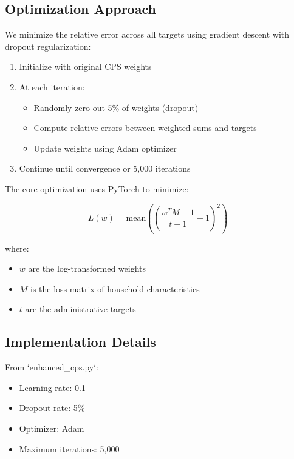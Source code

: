 \subsection{Optimization Approach}

We minimize the relative error across all targets using gradient descent with dropout regularization:

\begin{enumerate}
    \item Initialize with original CPS weights
    \item At each iteration:
    \begin{itemize}
        \item Randomly zero out 5\% of weights (dropout)
        \item Compute relative errors between weighted sums and targets
        \item Update weights using Adam optimizer
    \end{itemize}
    \item Continue until convergence or 5,000 iterations
\end{enumerate}

The core optimization uses PyTorch to minimize:

\[
L(w) = \text{mean}\left(\left(\frac{w^T M + 1}{t + 1} - 1\right)^2\right)
\]

where:
\begin{itemize}
    \item $w$ are the log-transformed weights
    \item $M$ is the loss matrix of household characteristics
    \item $t$ are the administrative targets
\end{itemize}

\subsection{Implementation Details}

From `enhanced_cps.py`:
\begin{itemize}
    \item Learning rate: 0.1
    \item Dropout rate: 5\%
    \item Optimizer: Adam
    \item Maximum iterations: 5,000
\end{itemize}


